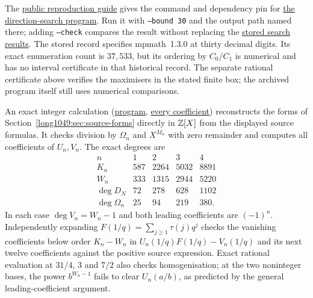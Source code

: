 \documentclass[11pt]{article}
\begin{document}
The \href{https://github.com/wcook04/plectis-erdos/blob/f5c9e560df38cd32e9b49473a409384aab00d9ae/research/experiments/erdos1049/README.md}{public reproduction guide} gives the command and dependency pin for
\href{https://github.com/wcook04/plectis-erdos/blob/39a0a2078c8f9fbe7fc24f912654815cc24685df/research/experiments/erdos1049/direction_search.py}{the direction-search program}.
Run it with \texttt{--bound 30} and the output path named there; adding
\texttt{--check} compares the result without replacing the
\href{https://github.com/wcook04/plectis-erdos/blob/39a0a2078c8f9fbe7fc24f912654815cc24685df/research/experiments/erdos1049/receipts/direction-search-bound30.json}{stored search results}.
The stored record specifies mpmath~1.3.0 at thirty decimal digits.  Its exact enumeration
count is $37{,}533$, but its ordering by $C_0/C_1$ is numerical and has no
interval certificate in that historical record. The separate rational
certificate above verifies the maximisers in the stated finite box;
the archived program itself still uses numerical comparisons.

An exact integer calculation (\href{https://github.com/wcook04/plectis-erdos/blob/4beca4ad0c00a626def9c73f2420e20ebf8d1968/research/experiments/erdos1049/source_polynomials.py}{program}, \href{https://github.com/wcook04/plectis-erdos/blob/4beca4ad0c00a626def9c73f2420e20ebf8d1968/research/experiments/erdos1049/receipts/source-polynomials.json}{every coefficient}) reconstructs the forms of
Section~\ref{long1049:sec:source-forms}
directly in $\mathbb{Z}[X]$ from the displayed source formulas. It checks
division by $\Omega_n$ and $X^{M_n}$ with zero remainder and computes
all coefficients of $U_n,V_n$. The exact degrees are
\[
\begin{array}{c|rrrr}
 n&1&2&3&4\\\hline
 K_n&587&2264&5032&8891\\
 W_n&333&1315&2944&5220\\
 \deg D_N&72&278&628&1102\\
 \deg\Omega_n&25&94&219&380.
\end{array}
\]
In each case $\deg V_n=W_n-1$ and both leading coefficients are
$(-1)^n$. Independently expanding $F(1/q)=\sum_{j\ge1}\tau(j)q^j$
checks the vanishing coefficients below order $K_n-W_n$ in
$U_n(1/q)F(1/q)-V_n(1/q)$ and its next twelve coefficients against
the positive source expression. Exact rational evaluation at
$31/4$, $3$ and $7/2$ also checks homogenisation; at the two noninteger
bases, the power $b^{W_n-1}$ fails to clear $U_n(a/b)$, as predicted
by the general leading-coefficient argument.
\end{document}
